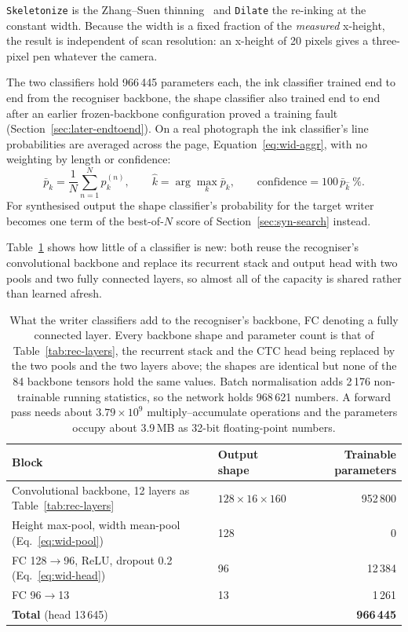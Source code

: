 \texttt{Skeletonize} is the Zhang--Suen thinning~\cite{zhang1984} and \texttt{Dilate} the re-inking at the constant width. Because the width is a fixed fraction of the \emph{measured} x-height, the result is independent of scan resolution: an x-height of 20 pixels gives a three-pixel pen whatever the camera.

The two classifiers hold 966\,445 parameters each, the ink classifier trained end to end from the recogniser backbone, the shape classifier also trained end to end after an earlier frozen-backbone configuration proved a training fault (Section~\ref{sec:later-endtoend}). On a real photograph the ink classifier's line probabilities are averaged across the page, Equation~\ref{eq:wid-aggr}, with no weighting by length or confidence:
\begin{equation}
\bar p_k=\frac1N\sum_{n=1}^Np^{(n)}_k,\qquad\hat k=\arg\max_k\bar p_k,\qquad\text{confidence}=100\,\bar p_{\hat k}\ \%.
\label{eq:wid-aggr}
\end{equation}
For synthesised output the shape classifier's probability for the target writer becomes one term of the best-of-$N$ score of Section~\ref{sec:syn-search} instead.

Table~\ref{tab:wid-layers} shows how little of a classifier is new: both reuse the recogniser's convolutional backbone and replace its recurrent stack and output head with two pools and two fully connected layers, so almost all of the capacity is shared rather than learned afresh.

\begin{table}[!htbp]
\centering
\fontsize{8}{9.6}\selectfont
\setlength{\tabcolsep}{4pt}
\begin{tabular}{|l|l|r|}
\hline
\textbf{Block} & \textbf{Output shape} & \textbf{Trainable parameters} \\
\hline
Convolutional backbone, 12 layers as Table~\ref{tab:rec-layers} & $128\times16\times160$ & 952\,800 \\
Height max-pool, width mean-pool (Eq.~\ref{eq:wid-pool}) & 128 & 0 \\
FC 128$\to$96, ReLU, dropout 0.2 (Eq.~\ref{eq:wid-head}) & 96 & 12\,384 \\
FC 96$\to$13 & 13 & 1\,261 \\
\hline
\textbf{Total} (head 13\,645) & & \textbf{966\,445} \\
\hline
\end{tabular}
\caption{What the writer classifiers add to the recogniser's backbone, FC denoting a fully connected layer. Every backbone shape and parameter count is that of Table~\ref{tab:rec-layers}, the recurrent stack and the CTC head being replaced by the two pools and the two layers above; the shapes are identical but none of the 84 backbone tensors hold the same values. Batch normalisation adds 2\,176 non-trainable running statistics, so the network holds 968\,621 numbers. A forward pass needs about $3.79\times10^9$ multiply--accumulate operations and the parameters occupy about 3.9\,MB as 32-bit floating-point numbers.}
\label{tab:wid-layers}
\end{table}

